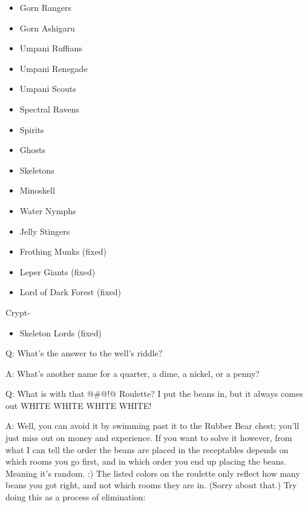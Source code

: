\documentclass[12pt]{article}
\providecommand{\tightlist}{%
  \setlength{\itemsep}{0pt}\setlength{\parskip}{0pt}}
\begin{document}
\begin{itemize}
\tightlist
\item
  Gorn Rangers
\item
  Gorn Ashigaru
\item
  Umpani Ruffians
\item
  Umpani Renegade
\item
  Umpani Scouts
\item
  Spectral Ravens
\item
  Spirits
\item
  Ghosts
\item
  Skeletons
\item
  Minoskell
\item
  Water Nymphs
\item
  Jelly Stingers
\item
  Frothing Munks (fixed)
\item
  Leper Giants (fixed)
\item
  Lord of Dark Forest (fixed)
\end{itemize}

Crypt-

\begin{itemize}
\tightlist
\item
  Skeleton Lords (fixed)
\end{itemize}

Q: What's the answer to the well's riddle?

A: What's another name for a quarter, a dime, a nickel, or a penny?

Q: What is with that @\#@!@ Roulette? I put the beans in, but it always
comes out WHITE WHITE WHITE WHITE!

A: Well, you can avoid it by swimming past it to the Rubber Bear chest;
you'll just miss out on money and experience. If you want to solve it
however, from what I can tell the order the beans are placed in the
receptables depends on which rooms you go first, and in which order you
end up placing the beans. Meaning it's random. :) The listed colors on
the roulette only reflect how many beans you got right, and not which
rooms they are in. (Sorry about that.) Try doing this as a process of
elimination:
\end{document}
